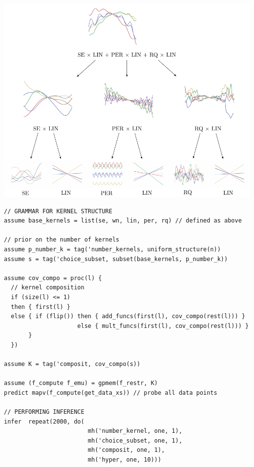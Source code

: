 \documentclass[a0,portrait]{a0poster}
\begin{document}
\begin{multicols}{3}
\begin{center}\vspace{1cm}
\includegraphics[width=0.8\linewidth]{parseTree.pdf}
\end{center}
\vspace{1cm}

\begin{minipage}{\linewidth}
\small
\begin{lstlisting}[frame=single,label=alg:structureVent,mathescape]
// GRAMMAR FOR KERNEL STRUCTURE
assume base_kernels = list(se, wn, lin, per, rq) // defined as above

// prior on the number of kernels
assume p_number_k = tag('number_kernels, uniform_structure(n))
assume s = tag('choice_subset, subset(base_kernels, p_number_k))

assume cov_compo = proc(l) {
  // kernel composition
  if (size(l) <= 1)
  then { first(l) }
  else { if (flip()) then { add_funcs(first(l), cov_compo(rest(l))) }
                     else { mult_funcs(first(l), cov_compo(rest(l))) }
       }
  })
                          
assume K = tag('composit, cov_compo(s))

assume (f_compute f_emu) = gpmem(f_restr, K)
predict mapv(f_compute(get_data_xs)) // probe all data points

// PERFORMING INFERENCE  
infer  repeat(2000, do(
                        mh('number_kernel, one, 1),
                        mh('choice_subset, one, 1),
                        mh('composit, one, 1),
                        mh('hyper, one, 10)))
\end{lstlisting}


\end{minipage}
\end{multicols}
\end{document}
